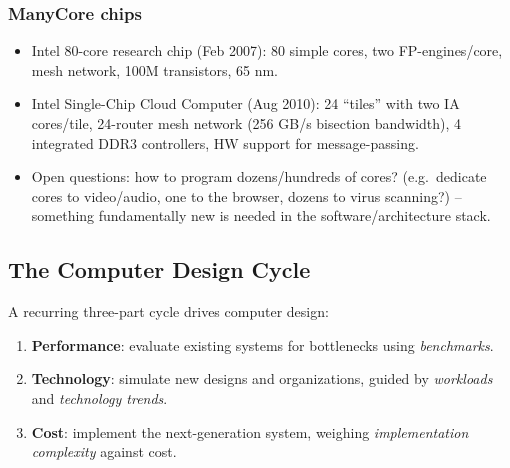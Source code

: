 \subsubsection{ManyCore chips}
\begin{itemize}
  \item Intel 80-core research chip (Feb 2007): 80 simple cores, two
  FP-engines/core, mesh network, 100M transistors, 65 nm.
  \item Intel Single-Chip Cloud Computer (Aug 2010): 24 ``tiles'' with two
  IA cores/tile, 24-router mesh network (256 GB/s bisection bandwidth), 4
  integrated DDR3 controllers, HW support for message-passing.
  \item Open questions: how to program dozens/hundreds of cores? (e.g.\
  dedicate cores to video/audio, one to the browser, dozens to virus
  scanning?) -- something fundamentally new is needed in the
  software/architecture stack.
\end{itemize}

\subsection{The Computer Design Cycle}

A recurring three-part cycle drives computer design:

\begin{enumerate}
  \item \textbf{Performance}: evaluate existing systems for bottlenecks
  using \emph{benchmarks}.
  \item \textbf{Technology}: simulate new designs and organizations, guided
  by \emph{workloads} and \emph{technology trends}.
  \item \textbf{Cost}: implement the next-generation system, weighing
  \emph{implementation complexity} against cost.
\end{enumerate}

